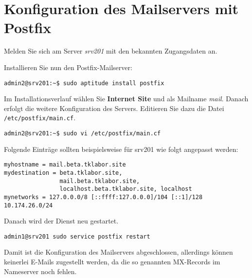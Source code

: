 \section{Konfiguration des Mailservers mit Postfix}

Melden Sie sich am Server \textit{srv201} mit den bekannten Zugangsdaten an. 

Installieren Sie nun den Postfix-Mailserver:
\begin{lstlisting}
admin2@srv201:~$ sudo aptitude install postfix
\end{lstlisting}
Im Installationsverlauf wählen Sie \textbf{Internet Site} und als Mailname
\textit{mail}. Danach erfolgt die weitere Konfiguration des Servers. Editieren
Sie dazu die Datei \texttt{/etc/postfix/main.cf}.
\begin{scriptsize}
\begin{lstlisting}
admin2@srv201:~$ sudo vi /etc/postfix/main.cf
\end{lstlisting}
Folgende Einträge sollten beispielsweise für srv201 wie folgt angepasst werden:
\begin{lstlisting}
myhostname = mail.beta.tklabor.site
mydestination = beta.tklabor.site, 
                mail.beta.tklabor.site, 
                localhost.beta.tklabor.site, localhost
mynetworks = 127.0.0.0/8 [::ffff:127.0.0.0]/104 [::1]/128 10.174.26.0/24
\end{lstlisting}
\end{scriptsize}

Danach wird der Dienst neu gestartet.
\begin{lstlisting}
admin1@srv201 sudo service postfix restart
\end{lstlisting}
Damit ist die Konfiguration des Mailservers abgeschlossen, allerdings können keinerlei E-Mails zugestellt werden, da die so genannten MX-Records im Nameserver noch fehlen.

